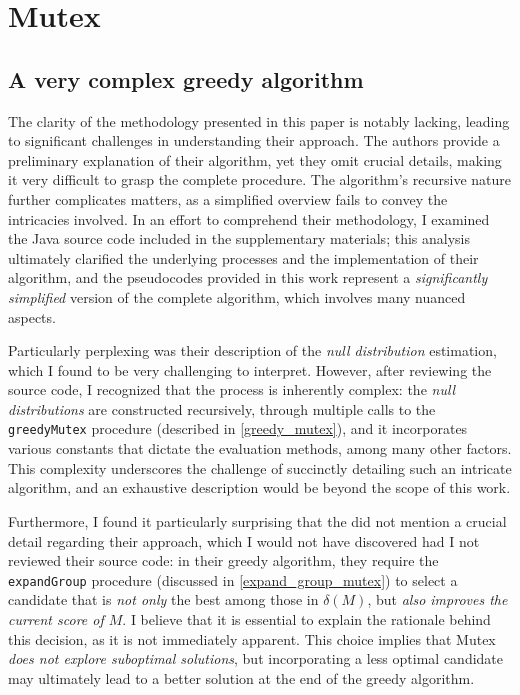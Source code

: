 \section{Mutex}

\subsection{A very complex greedy algorithm}

The clarity of the methodology presented in this paper is notably lacking, leading to significant challenges in understanding their approach. The authors provide a preliminary explanation of their algorithm, yet they omit crucial details, making it very difficult to grasp the complete procedure. The algorithm's recursive nature further complicates matters, as a simplified overview fails to convey the intricacies involved. In an effort to comprehend their methodology, I examined the Java source code included in the supplementary materials; this analysis ultimately clarified the underlying processes and the implementation of their algorithm, and the pseudocodes provided in this work represent a \textit{significantly simplified} version of the complete algorithm, which involves many nuanced aspects.

Particularly perplexing was their description of the \textit{null distribution} estimation, which I found to be very challenging to interpret. However, after reviewing the source code, I recognized that the process is inherently complex: the \textit{null distributions} are constructed recursively, through multiple calls to the \texttt{greedyMutex} procedure (described in \cref{greedy_mutex}), and it incorporates various constants that dictate the evaluation methods, among many other factors. This complexity underscores the challenge of succinctly detailing such an intricate algorithm, and an exhaustive description would be beyond the scope of this work.

Furthermore, I found it particularly surprising that the \textcite{mutex} did not mention a crucial detail regarding their approach, which I would not have discovered had I not reviewed their source code: in their greedy algorithm, they require the \texttt{expandGroup} procedure (discussed in \cref{expand_group_mutex}) to select a candidate that is \textit{not only} the best among those in $\delta(M)$, but \textit{also improves the current score of $M$}. I believe that it is essential to explain the rationale behind this decision, as it is not immediately apparent. This choice implies that Mutex \textit{does not explore suboptimal solutions}, but incorporating a less optimal candidate may ultimately lead to a better solution at the end of the greedy algorithm.

